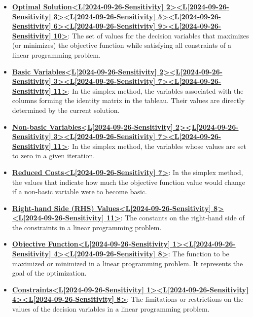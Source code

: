 \documentclass{article}%
\begin{document}
\begin{itemize}[leftmargin=*]
\item \href{https://www.math.purdue.edu/~yipn/421/2024-09-26-Sensitivity.pdf#page=2}{\textbf{Optimal Solution<L{[}2024{-}09{-}26{-}Sensitivity{]} 2><L{[}2024{-}09{-}26{-}Sensitivity{]} 3><L{[}2024{-}09{-}26{-}Sensitivity{]} 5><L{[}2024{-}09{-}26{-}Sensitivity{]} 6><L{[}2024{-}09{-}26{-}Sensitivity{]} 9><L{[}2024{-}09{-}26{-}Sensitivity{]} 10>}}: The set of values for the decision variables that maximizes (or minimizes) the objective function while satisfying all constraints of a linear programming problem.%
\item \href{https://www.math.purdue.edu/~yipn/421/2024-09-26-Sensitivity.pdf#page=2}{\textbf{Basic Variables<L{[}2024{-}09{-}26{-}Sensitivity{]} 2><L{[}2024{-}09{-}26{-}Sensitivity{]} 3><L{[}2024{-}09{-}26{-}Sensitivity{]} 7><L{[}2024{-}09{-}26{-}Sensitivity{]} 11>}}: In the simplex method, the variables associated with the columns forming the identity matrix in the tableau. Their values are directly determined by the current solution. %
\item \href{https://www.math.purdue.edu/~yipn/421/2024-09-26-Sensitivity.pdf#page=2}{\textbf{Non{-}basic Variables<L{[}2024{-}09{-}26{-}Sensitivity{]} 2><L{[}2024{-}09{-}26{-}Sensitivity{]} 3><L{[}2024{-}09{-}26{-}Sensitivity{]} 7><L{[}2024{-}09{-}26{-}Sensitivity{]} 11>}}: In the simplex method, the variables whose values are set to zero in a given iteration. %
\item \href{https://www.math.purdue.edu/~yipn/421/2024-09-26-Sensitivity.pdf#page=7}{\textbf{Reduced Costs<L{[}2024{-}09{-}26{-}Sensitivity{]} 7>}}: In the simplex method, the values that indicate how much the objective function value would change if a non-basic variable were to become basic.%
\item \href{https://www.math.purdue.edu/~yipn/421/2024-09-26-Sensitivity.pdf#page=8}{\textbf{Right{-}hand Side (RHS) Values<L{[}2024{-}09{-}26{-}Sensitivity{]} 8><L{[}2024{-}09{-}26{-}Sensitivity{]} 11>}}: The constants on the right-hand side of the constraints in a linear programming problem.%
\item \href{https://www.math.purdue.edu/~yipn/421/2024-09-26-Sensitivity.pdf#page=1}{\textbf{Objective Function<L{[}2024{-}09{-}26{-}Sensitivity{]} 1><L{[}2024{-}09{-}26{-}Sensitivity{]} 4><L{[}2024{-}09{-}26{-}Sensitivity{]} 8>}}: The function to be maximized or minimized in a linear programming problem. It represents the goal of the optimization. %
\item \href{https://www.math.purdue.edu/~yipn/421/2024-09-26-Sensitivity.pdf#page=1}{\textbf{Constraints<L{[}2024{-}09{-}26{-}Sensitivity{]} 1><L{[}2024{-}09{-}26{-}Sensitivity{]} 4><L{[}2024{-}09{-}26{-}Sensitivity{]} 8>}}: The limitations or restrictions on the values of the decision variables in a linear programming problem. %

\end{itemize}
\end{document}
